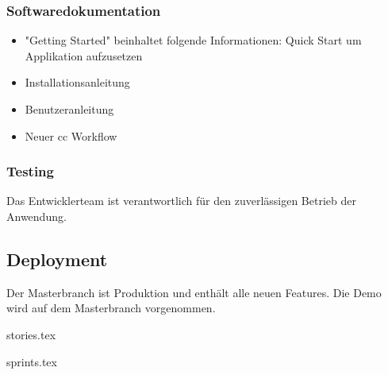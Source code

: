 \subsubsection{Softwaredokumentation}
\begin{itemize}
	\item "Getting Started" beinhaltet folgende Informationen: Quick Start um Applikation aufzusetzen
	\item Installationsanleitung
	\item Benutzeranleitung
	\item Neuer \gls{cc} Workflow
\end{itemize}

\subsubsection{Testing}
Das Entwicklerteam ist verantwortlich für den zuverlässigen Betrieb der Anwendung.

\subsection{Deployment}
Der Masterbranch ist Produktion und enthält alle neuen Features. Die Demo wird auf dem Masterbranch vorgenommen.

{stories.tex}

{sprints.tex}
